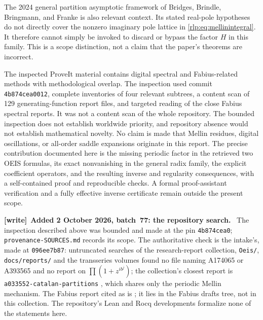 \documentclass[11pt,letterpaper]{article}
\numberwithin{equation}{section}
\theoremstyle{remark}\newtheorem{remark}[theorem]{Remark}
\newenvironment{writenote}[1][]{\par\smallskip\begingroup\small
 \noindent\textbf{[write]}\if\relax\detokenize{#1}\relax\else~\textbf{#1.}\fi\ }%
 {\par\endgroup\smallskip}
\begin{document}
The 2024 general partition asymptotic framework of Bridges, Brindle, Bringmann, and Franke \cite{bridges} is also relevant context. Its stated real-pole hypotheses do not directly cover the nonzero imaginary pole lattice in \eqref{rlp:eq:mellinintegral}. It therefore cannot simply be invoked to discard or bypass the factor $H$ in this family. This is a scope distinction, not a claim that the paper's theorems are incorrect.

The inspected ProveIt material \cite{proveit} contains digital spectral and Fabius-related methods with methodological overlap. The inspection used commit \texttt{4b874cea0012}, complete inventories of four relevant subtrees, a content scan of 129 generating-function report files, and targeted reading of the close Fabius spectral reports. It was not a content scan of the whole repository. The bounded inspection does not establish worldwide priority, and repository absence would not establish mathematical novelty. No claim is made that Mellin residues, digital oscillations, or all-order saddle expansions originate in this report. The precise contribution documented here is the missing periodic factor in the retrieved two OEIS formulas, its exact nonvanishing in the general radix family, the explicit coefficient operators, and the resulting inverse and regularity consequences, with a self-contained proof and reproducible checks. A formal proof-assistant verification and a fully effective inverse certificate remain outside the present scope.

\begin{writenote}[Added 2 October 2026, batch~77: the repository search]
The inspection described above was bounded and made at the pin
\texttt{4b874cea0}; \texttt{provenance-SOURCES.md} records its scope. The
authoritative check is the intake's, made at \texttt{096ee7b87}: untruncated
searches of the research-report collection, \texttt{Oeis/},
\texttt{docs/reports/} and the transseries volumes found no file naming
A174065 or A393565 and no report on $\prod(1+z^{ib^j})$; the collection's
closest report is \texttt{a033552-\allowbreak catalan-\allowbreak partitions}
\cite{rlp-a033552}, which shares only the periodic Mellin mechanism. The
Fabius report cited as \cite{proveit} is \cite{rlp-fabius}; it lies in the
Fabius drafts tree, not in this collection. The repository's Lean and Rocq
developments formalize none of the statements here.
\end{writenote}
\end{document}
